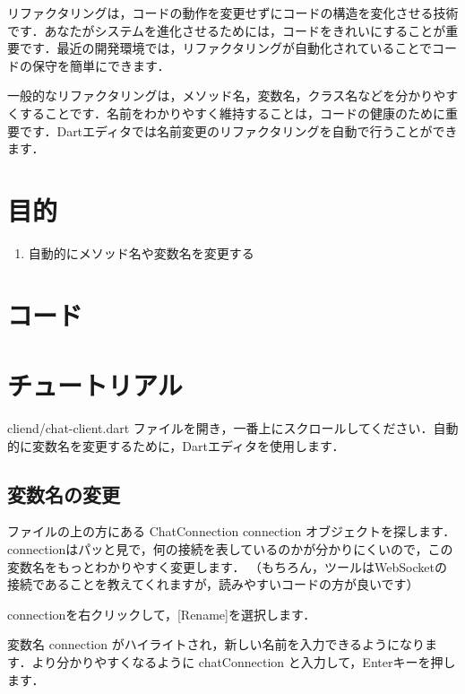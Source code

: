 
リファクタリングは，コードの動作を変更せずにコードの構造を変化させる技術です．あなたがシステムを進化させるためには，コードをきれいにすることが重要です．最近の開発環境では，リファクタリングが自動化されていることでコードの保守を簡単にできます．

一般的なリファクタリングは，メソッド名，変数名，クラス名などを分かりやすくすることです．名前をわかりやすく維持することは，コードの健康のために重要です．Dartエディタでは名前変更のリファクタリングを自動で行うことができます．

\section{目的}

\begin{enumerate}
\item 自動的にメソッド名や変数名を変更する
\end{enumerate}

\section{コード}


\section{チュートリアル}

cliend/chat-client.dart ファイルを開き，一番上にスクロールしてください．自動的に変数名を変更するために，Dartエディタを使用します．

\subsection{変数名の変更}

ファイルの上の方にある ChatConnection connection オブジェクトを探します．connectionはパッと見で，何の接続を表しているのかが分かりにくいので，この変数名をもっとわかりやすく変更します．
（もちろん，ツールはWebSocketの接続であることを教えてくれますが，読みやすいコードの方が良いです）

connectionを右クリックして，[Rename]を選択します．


変数名 connection がハイライトされ，新しい名前を入力できるようになります．より分かりやすくなるように chatConnection と入力して，Enterキーを押します．

